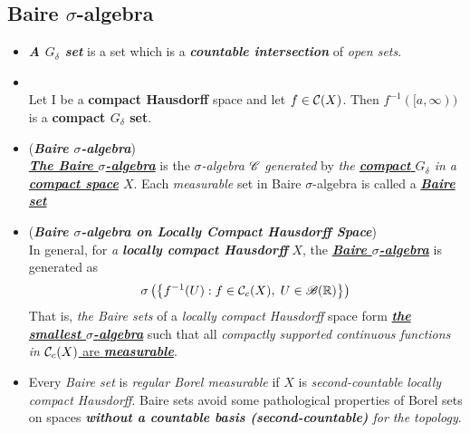 \documentclass[11pt]{article}
\begin{document}
\subsection{Baire $\sigma$-algebra}
\begin{itemize}
\item \begin{definition}
\emph{\textbf{A $G_{\delta}$ set}} is a set which is a \emph{\textbf{countable intersection}} of \emph{open sets}. 
\end{definition}

\item \begin{proposition} \citep{reed1980methods}\\
Let I be a \textbf{compact Hausdorff} space and let $f \in {\mathcal C}(X)$.  Then $f^{-1}([a, \infty))$ is a \textbf{compact $G_{\delta}$ set}. 
\end{proposition}

\item \begin{definition} (\textbf{\emph{Baire $\sigma$-algebra}})\\
\underline{\textbf{\emph{The Baire $\sigma$-algebra}}} is the \emph{$\sigma$-algebra} ${\mathscr C}$ \emph{generated} by \emph{the \underline{\textbf{compact}  $G_{\delta}$} in a \underline{\textbf{compact space}} $X$}. Each \emph{measurable} set in Baire $\sigma$-algebra is called a \underline{\textbf{\emph{Baire set}}}
\end{definition}

\item \begin{definition} (\emph{\textbf{Baire $\sigma$-algebra on Locally Compact Hausdorff Space}})\\
In general, for \emph{a \textbf{locally compact Hausdorff}} $X$, the \underline{\textbf{\emph{Baire $\sigma$-algebra}}} is generated as
\begin{align*}
\sigma\left(\left\{f^{-1}(U):  f \in {\mathcal C}_c(X), \; U \in {\mathscr B}({\mathbb R})\right\}\right)
\end{align*} That is, \emph{the Baire sets} of a \emph{locally compact Hausdorff} space form \underline{\emph{\textbf{the smallest $\sigma$-algebra}}} such that all \emph{compactly supported continuous functions in} \underline{${\mathcal C}_c(X)$ are \emph{\textbf{measurable}}}. 
\end{definition}

\item \begin{remark}
Every \emph{Baire set} is \emph{regular Borel measurable} if $X$ is \emph{second-countable} \emph{locally compact Hausdorff}. Baire sets avoid some pathological properties of Borel sets on spaces \emph{\textbf{without a countable basis (second-countable)} for the topology}.
\end{remark}



\end{itemize}
\end{document}
